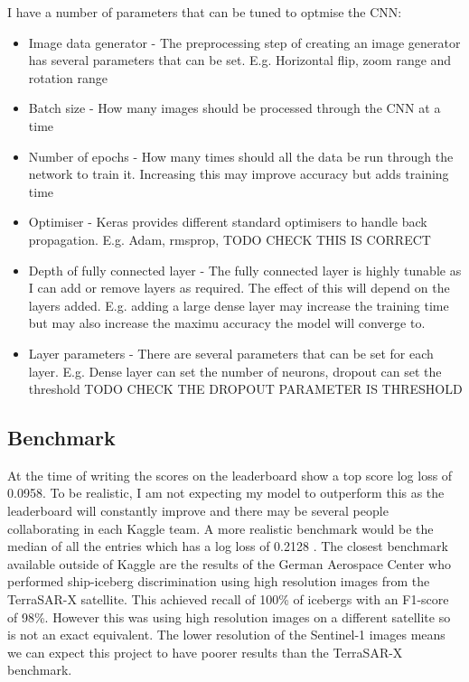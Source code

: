 \documentclass{article}
\begin{document}
I have a number of parameters that can be tuned to optmise the CNN:
\begin{itemize}
\item Image data generator - The preprocessing step of creating an image generator has several parameters that can be set. E.g. Horizontal flip, zoom range and rotation range
\item Batch size - How many images should be processed through the CNN at a time
\item Number of epochs - How many times should all the data be run through the network to train it. Increasing this may improve accuracy but adds training time
\item Optimiser - Keras provides different standard optimisers to handle back propagation. E.g. Adam, rmsprop,  TODO CHECK THIS IS CORRECT
\item Depth of fully connected layer - The fully connected layer is highly tunable as I can add or remove layers as required. The effect of this will depend on the layers added. E.g. adding a large dense layer may increase the training time but may also increase the maximu accuracy the model will converge to. 
\item Layer parameters - There are several parameters that can be set for each layer. E.g. Dense layer can set the number of neurons, dropout can set the threshold TODO CHECK THE DROPOUT PARAMETER IS THRESHOLD
\end{itemize}



\subsection{Benchmark}
At the time of writing the scores on the leaderboard show a top score log loss of 0.0958. To be realistic, I am not expecting my model to outperform this as the leaderboard will constantly improve and there may be several people collaborating in each Kaggle team. A more realistic benchmark would be the median of all the entries which has a log loss of 0.2128 \cite{kaggle}.
The closest benchmark available outside of Kaggle are the results of the German Aerospace Center \cite{bentes} who performed ship-iceberg discrimination using high resolution images from the TerraSAR-X satellite. This achieved recall of 100\% of icebergs with an F1-score of 98\%. However this was using high resolution images on a different satellite so is not an exact equivalent. The lower resolution of the Sentinel-1 images means we can expect this project to have poorer results than the TerraSAR-X benchmark. 
\end{document}
